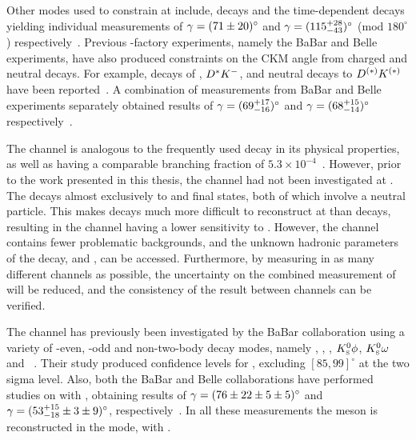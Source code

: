Other modes used to constrain \Pgamma at \lhcb include, \decay{\Bz}{\D\Kstarz} decays and the time-dependent \decay{\Bs}{\Dspm\Kmp} decays yielding individual measurements of $\gamma = (71 \pm 20)^{\circ}$ and $\gamma = (115^{+28}_{-43})^{\circ}$ (mod $180^{\circ}$) respectively~\cite{LHCb-PAPER-2016-006,LHCb-PAPER-2014-038}. Previous \B-factory experiments, namely the BaBar and Belle experiments, have also produced constraints on the CKM angle \Pgamma from charged and neutral \B decays. For example, decays of \decay{\Bm}{\D\Km}, ${D}^*{{K}^-}$, \D\Kstarm and neutral \B decays to ${D}^{(*)}K^{(*)}$ have been reported~\cite{BabarGLW_latest,BabarADS_latest,BaBar-Gamma-2013,BaBarGGSZ,BaBar_B0,BelleGLW_latest,BelleADS_latest,BelleGGSZ}. A combination of measurements from BaBar and Belle experiments separately obtained results of $\gamma = (69^{+17}_{-16})^{\circ}$ and $\gamma = (68^{+15}_{-14})^{\circ}$ respectively~\cite{Babar_gamma,Belle_gamma}.

The \decay{\Bm}{\D\Kstarm} channel is analogous to the frequently used \decay{\Bm}{\D\Km} decay in its physical properties, as well as having a comparable branching fraction of $5.3 \times 10^{-4}$~\cite{PDG2016}. However, prior to the work presented in this thesis, the \decay{\Bm}{\D\Kstarm} channel had not been investigated at \lhcb. The \Kstarm decays almost exclusively to \Kz\pim and \Km\piz final states, both of which involve a neutral particle. This makes \decay{\Bm}{\D\Kstarm} decays much more difficult to reconstruct at \lhcb than \decay{\Bm}{\D\Km} decays, resulting in the \decay{\Bm}{\D\Kstarm} channel having a lower sensitivity to \Pgamma. However, the \decay{\Bm}{\D\Kstarm} channel contains fewer problematic backgrounds, and the unknown hadronic parameters of the \decay{\Bm}{\D\Kstarm} decay, \rb and \deltab, can be accessed. Furthermore, by measuring \Pgamma in as many different channels as possible, the uncertainty on the combined measurement of \Pgamma will be reduced, and the consistency of the result between channels can be verified. 

The \decay{\Bm}{\D\Kstarm} channel has previously been investigated by the BaBar collaboration using a variety of \CP-even, \CP-odd and non-\CP two-body \D decay modes, namely \Km\Kp, \pim\pip, \KS\piz, ${{K}^0_{\mathrm{ \scriptscriptstyle S}}}\phi$, ${{K}^0_{\mathrm{ \scriptscriptstyle S}}}\omega$ and \Km\pip~\cite{BaBarDKstar}. Their study produced confidence levels for \Pgamma, excluding $[85,99]^{\circ}$ at the two sigma level. Also, both the BaBar and Belle collaborations have performed studies on \decay{\Bm}{\D\Kstarm} with \decay{\D}{\KS\pip\pim}, obtaining results of $\gamma = (76 \pm 22 \pm 5 \pm 5)^{\circ}$ and $\gamma = (53^{+15}_{-18} \pm 3 \pm 9)^{\circ}$, respectively~\cite{BaBarGGSZ,BelleGGSZ}. In all these measurements the \Kstarm meson is reconstructed in the \KS\pim mode, with \decay{\KS}{\pip\pim}.

